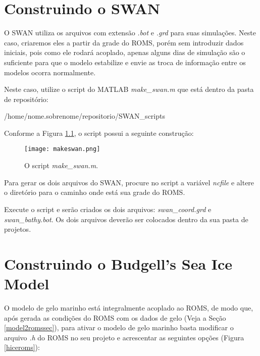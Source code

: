 \chapter{Construindo o SWAN}

\noindent O SWAN utiliza os arquivos com extensão \textit{.bot} e \textit{.grd} para suas simulações. Neste caso, criaremos eles a partir da grade do ROMS, porém sem introduzir dados iniciais, pois como ele rodará acoplado, apenas alguns dias de simulação são o suficiente para que o modelo estabilize e envie as troca de informação entre os modelos ocorra normalmente.
\bigskip

\noindent Neste caso,  utilize o script do MATLAB \textit{make\_swan.m} que está dentro da pasta de repositório:
\bigskip

\begin{bashcode}
/home/nome.sobrenome/repositorio/SWAN_scripts
\end{bashcode}
\bigskip

\noindent Conforme a Figura \textcolor{bleu_cite}{\ref{makeswan}}, o script possui a seguinte construção:
\bigskip

\begin{figure}[H]
    \centering
    \captionsetup{justification=centering}
    \texttt{[image: makeswan.png]}
    \caption{O script \textit{make\_swan.m}.}
    \label{makeswan}
\end{figure}
\bigskip

\noindent Para gerar os dois arquivos do SWAN, procure no script a variável \textit{ncfile} e altere o diretório para o caminho onde está sua grade do ROMS.
\bigskip

\noindent Execute o script e serão criados os dois arquivos: \textit {swan\_coord.grd} e \textit{swan\_bathy.bot}. Os dois arquivos deverão ser colocados dentro da sua pasta de projetos.
\bigskip

\chapter{Construindo o Budgell's Sea Ice Model}
\bigskip

\noindent O modelo de gelo marinho está integralmente acoplado ao ROMS, de modo que, após gerada as condições do ROMS com os dados de gelo (Veja a Seção \textcolor{bleu_cite}{\ref{model2romssec}}), para ativar o modelo de gelo marinho basta modificar o arquivo \textit{.h} do ROMS no seu projeto e acrescentar as seguintes opções (Figura \textcolor{bleu_cite}{\ref{hiceroms}}):
\bigskip

